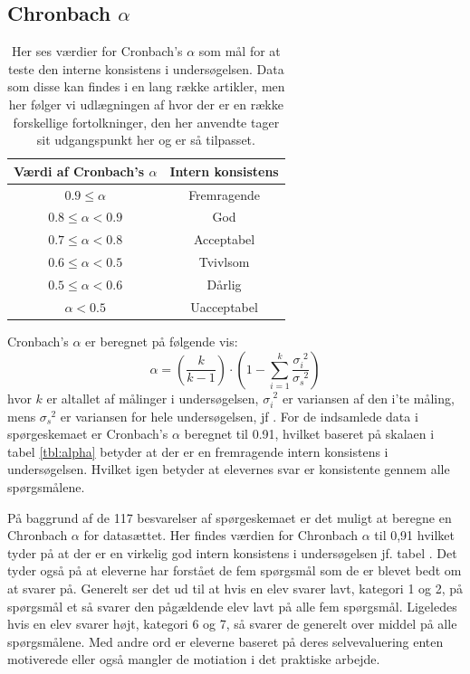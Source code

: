 \subsection*{Chronbach $\alpha$}
\begin{table}[h!]
	\centering
	\caption[Chronbach's $\alpha$ værdier]{Her ses værdier for Cronbach's $\alpha$ som mål for at teste den interne konsistens i undersøgelsen. Data som disse kan findes i en lang række artikler, men her følger vi udlægningen af \citep[Tabel 1, s. 382]{Peterson1994} hvor der er en række forskellige fortolkninger, den her anvendte tager sit udgangspunkt her og er så tilpasset.}
	\label{tbl:alpha}
	\begin{tabular}{@{ } c c @{ }}
		\toprule[2.pt]
		Værdi af Cronbach's $\alpha$ & Intern konsistens\\
		\midrule
		$0.9\leq \alpha$ 		& Fremragende\\
		$0.8\leq \alpha < 0.9$ 	& God\\
		$0.7\leq \alpha < 0.8$	& Acceptabel\\
		$0.6\leq \alpha < 0.5$	& Tvivlsom\\
		$0.5\leq \alpha < 0.6$ 	& Dårlig\\
		$\alpha < 0.5$			& Uacceptabel\\
		\bottomrule[2pt]
	\end{tabular}
\end{table}
Cronbach's  $\alpha$ er beregnet på følgende vis: 
\begin{equation}\label{eq:alpha}
	\alpha = \left(\frac{k}{k-1}\right)\cdot \left(1-\sum_{i=1}^{k} \frac{\sigma^{\phantom{i}2}_{i}}{\sigma^{\phantom{s}2}_{s}}\right)
\end{equation}
hvor $k$ er altallet af målinger i undersøgelsen, $\sigma^{\phantom{i}2}_{i}$ er variansen af den i'te måling, mens $\sigma^{\phantom{s}2}_{s}$ er variansen for hele undersøgelsen, jf \cite[s.382]{Peterson1994}. For de indsamlede data i spørgeskemaet er Cronbach's $\alpha$ beregnet til 0.91, hvilket baseret på skalaen i tabel \vref{tbl:alpha} betyder at der er en fremragende intern konsistens i undersøgelsen. Hvilket igen betyder at elevernes svar er konsistente gennem alle spørgsmålene. 

På baggrund af de 117 besvarelser af spørgeskemaet er det muligt at beregne en Chronbach $\alpha$ for datasættet. Her findes værdien for Chronbach $\alpha$ til 0,91 hvilket tyder på at der er en virkelig god intern konsistens i undersøgelsen jf. tabel . Det tyder også på at eleverne har forstået de fem spørgsmål som de er blevet bedt om at svarer på.  Generelt ser det ud til at hvis en elev svarer lavt, kategori 1 og 2, på spørgsmål et så svarer den pågældende elev lavt på alle fem spørgsmål. Ligeledes hvis en elev svarer højt, kategori 6 og 7, så svarer de generelt over middel på alle spørgsmålene. Med andre ord er eleverne baseret på deres selvevaluering enten motiverede eller også mangler de motiation i det praktiske arbejde.

